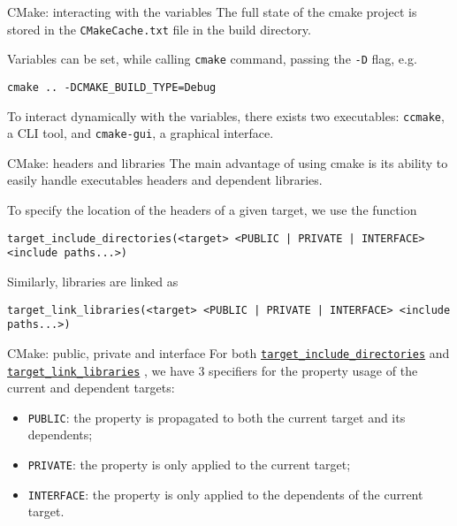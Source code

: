 \begin{frame}[fragile]{CMake: interacting with the variables}
    The full state of the cmake project is stored in the \texttt{CMakeCache.txt} file in the build directory.

    Variables can be set, while calling \texttt{cmake} command, passing the \texttt{-D} flag, e.g. 
\begin{lstlisting}
cmake .. -DCMAKE_BUILD_TYPE=Debug   
\end{lstlisting}


To interact dynamically with the variables, there exists two executables: \alert{\texttt{ccmake}}, a CLI tool, and \alert{\texttt{cmake-gui}}, a graphical interface.
\end{frame}

\begin{frame}[fragile]{CMake: headers and libraries}
    The main advantage of using cmake is its ability to easily handle executables headers and dependent libraries.

    To specify the location of the headers of a given target, we use the function
\begin{lstlisting}
target_include_directories(<target> <PUBLIC | PRIVATE | INTERFACE> <include paths...>)
\end{lstlisting}

    Similarly, libraries are linked as
\begin{lstlisting}
target_link_libraries(<target> <PUBLIC | PRIVATE | INTERFACE> <include paths...>)
\end{lstlisting}
\end{frame}

\begin{frame}[fragile]{CMake: public, private and interface}
    For both 
    \href{https://cmake.org/cmake/help/latest/command/target_include_directories.html}{\texttt{target\_include\_directories}} 
    and 
    \href{https://cmake.org/cmake/help/latest/command/target_link_libraries.html#target-link-libraries}{\texttt{target\_link\_libraries}}
    , we have 3 specifiers for the property usage of the current and dependent targets:
    \begin{itemize}
        \item \alert{\texttt{PUBLIC}}: the property is propagated to both the current target and its dependents;
        \item \alert{\texttt{PRIVATE}}: the property is only applied to the current target;
        \item \alert{\texttt{INTERFACE}}: the property is only applied to the dependents of the current target.
    \end{itemize}
\end{frame}

